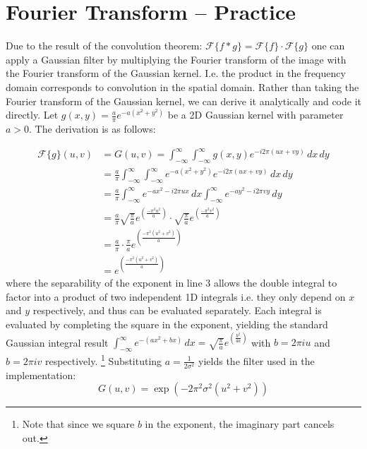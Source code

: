 \section{Fourier Transform -- Practice}

Due to the result of the convolution theorem:
$\mathcal{F}\{f * g\} = \mathcal{F}\{f\} \cdot \mathcal{F}\{g\}$
one can apply a Gaussian filter by multiplying the Fourier transform of
the image with the Fourier transform of the Gaussian kernel.
I.e. the product in the frequency domain corresponds to convolution in the spatial domain.
Rather than taking the Fourier transform of the Gaussian kernel,
we can derive it analytically and code it directly.
Let $g(x, y) = \frac{a}{\pi} e^{-a(x^2 + y^2)}$ be a 2D Gaussian kernel with parameter $a > 0$.
The derivation is as follows:

\begin{align}
    \mathcal{F}\{g\}(u, v)
    &= G(u, v)
    = \int_{-\infty}^{\infty} \int_{-\infty}^{\infty} g(x, y) e^{-i 2 \pi (ux + vy)} \, dx \, dy \\
    &= \frac{a}{\pi} \int_{-\infty}^{\infty} \int_{-\infty}^{\infty}
       e^{-a(x^2 + y^2)} e^{-i 2 \pi (ux + vy)} \, dx \, dy \\
    &= \frac{a}{\pi} \int_{-\infty}^{\infty} e^{-ax^2 -i 2 \pi ux} \, dx
       \int_{-\infty}^{\infty} e^{-ay^2 -i 2 \pi vy} \, dy \\
    &= \frac{a}{\pi}
       \sqrt{\frac{\pi}{a}} e^{\left(
		   \frac{-\pi^2 u^2}{a}
	   \right)}
       \cdot
       \sqrt{\frac{\pi}{a}} e^{\left(
		   \frac{-\pi^2 v^2}{a}
   	   \right)} \\
    &= \frac{a}{\pi} \cdot \frac{\pi}{a}
       e^{\left(
		   \frac{-\pi^2 (u^2 + v^2)}{a}
   	   \right)} \\
    &= e^{\left(
		\frac{-\pi^2 (u^2 + v^2)}{a}
	\right)}
\end{align}
where the separability of the exponent in line 3 allows the double integral to factor
into a product of two independent 1D integrals i.e. they only depend on $x$ and $y$ respectively,
and thus can be evaluated separately.
Each integral is evaluated by completing the square in the exponent,
yielding the standard Gaussian integral result
$\int_{-\infty}^{\infty} e^{-(ax^2 + bx)} \, dx 
= \sqrt{\frac{\pi}{a}} e^{\left(
	\frac{b^2}{4a}
\right)}$
with $b = 2\pi i u$ and $b = 2\pi i v$ respectively.
\footnote{
	Note that since we square $b$ in the exponent,
	the imaginary part cancels out.
}
Substituting $a = \frac{1}{2\sigma^2}$ yields the filter used in the implementation:
\begin{equation}
    G(u, v) = \exp\!\left(-2\pi^2 \sigma^2 (u^2 + v^2)\right)
\end{equation}

